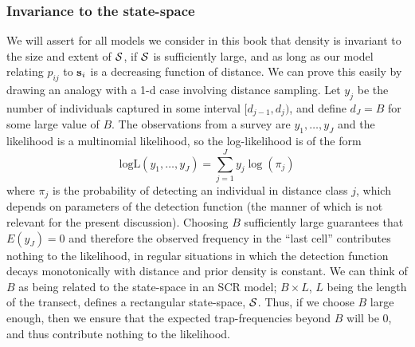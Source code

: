 \subsubsection{Invariance to the state-space}
\label{scr0.sec.invariance}

We will assert for all models we consider in this book that density is
invariant to the size and extent of ${\cal S}$, if ${\cal S}$ is
sufficiently large, and as long as our model relating $p_{ij}$ to
${\bf s}_{i}$ is a decreasing function of distance.  We can prove this
easily by drawing an analogy with a 1-d case involving distance
sampling.  Let $y_{j}$ be the number of individuals captured in some
interval $[d_{j-1},d_{j})$, and define $d_{J} = B$ for some large
value of $B$. 
 The observations from a survey are $y_{1},\ldots,y_J$
and the likelihood is a multinomial likelihood, so the log-likelihood
is of the form
\[
\mbox{logL}(y_{1},\ldots,y_{J}) = \sum_{j=1}^{J} y_{j} \log( \pi_{j} )
\]
where $\pi_{j}$ is the probability of detecting an individual in
distance class $j$, which depends on parameters of the detection
function (the manner of which is not relevant for the present
discussion).  Choosing $B$ sufficiently large guarantees that $E(y_{J})
= 0$ and therefore the observed frequency in the ``last cell''
contributes nothing to the likelihood, in regular situations in which
the detection function decays monotonically with distance and prior
density is constant.
We can think of $B$ as being related to the state-space
in an SCR model; $B \times L$, $L$ being the length of the transect, defines
a rectangular state-space, ${\cal S}$. Thus, if we choose $B$ large enough, then
we ensure that the expected trap-frequencies beyond $B$ will be 0, and
thus contribute nothing to the likelihood. 

